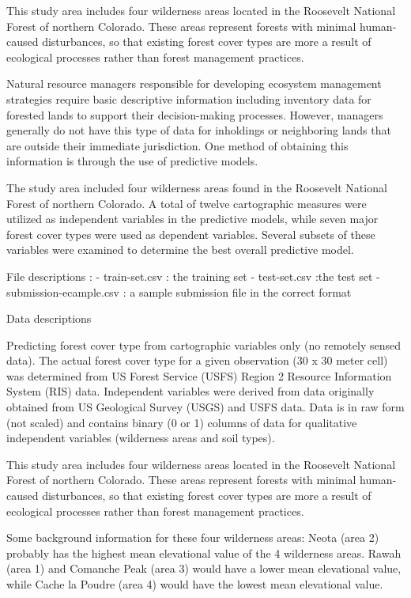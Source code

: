 \documentclass[11pt]{article}
\begin{document}
This study area includes four wilderness areas located in the Roosevelt
National Forest of northern Colorado. These areas represent forests with
minimal human-caused disturbances, so that existing forest cover types
are more a result of ecological processes rather than forest management
practices.

    Natural resource managers responsible for developing ecosystem
management strategies require basic descriptive information including
inventory data for forested lands to support their decision-making
processes. However, managers generally do not have this type of data for
inholdings or neighboring lands that are outside their immediate
jurisdiction. One method of obtaining this information is through the
use of predictive models.

The study area included four wilderness areas found in the Roosevelt
National Forest of northern Colorado. A total of twelve cartographic
measures were utilized as independent variables in the predictive
models, while seven major forest cover types were used as dependent
variables. Several subsets of these variables were examined to determine
the best overall predictive model.

File descriptions : - train-set.csv : the training set - test-set.csv
:the test set - submission-ecample.csv : a sample submission file in the
correct format

Data descriptions

Predicting forest cover type from cartographic variables only (no
remotely sensed data). The actual forest cover type for a given
observation (30 x 30 meter cell) was determined from US Forest Service
(USFS) Region 2 Resource Information System (RIS) data. Independent
variables were derived from data originally obtained from US Geological
Survey (USGS) and USFS data. Data is in raw form (not scaled) and
contains binary (0 or 1) columns of data for qualitative independent
variables (wilderness areas and soil types).

This study area includes four wilderness areas located in the Roosevelt
National Forest of northern Colorado. These areas represent forests with
minimal human-caused disturbances, so that existing forest cover types
are more a result of ecological processes rather than forest management
practices.

Some background information for these four wilderness areas: Neota (area
2) probably has the highest mean elevational value of the 4 wilderness
areas. Rawah (area 1) and Comanche Peak (area 3) would have a lower mean
elevational value, while Cache la Poudre (area 4) would have the lowest
mean elevational value.
\end{document}
